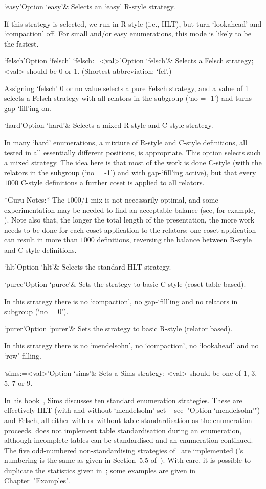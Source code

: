 \>`easy'{Option `easy'}&
Selects an \lq{}easy' R-style strategy.

If this strategy is selected, we run in R-style (i.e., HLT), but  turn
`lookahead' and `compaction' off. For small and/or easy  enumerations,
this mode is likely to be the fastest.

\>`felsch'{Option `felsch'}
\>`felsch:=<val>'{Option `felsch'}&
Selects a Felsch strategy; <val> should be 0 or 1. 
(Shortest abbreviation: `fel'.)

Assigning `felsch' 0 or no value selects a pure Felsch strategy, and a
value of 1 selects a Felsch strategy with all relators in the subgroup
(`no = -1') and turns gap-`fill'ing on.

\>`hard'{Option `hard'}&  
Selects a mixed R-style and C-style strategy.

In many \lq{}hard' enumerations, a  mixture  of  R-style  and  C-style
definitions, all tested in all  essentially  different  positions,  is
appropriate. This option selects such a mixed strategy. The idea  here
is that most of the work is done C-style (with  the  relators  in  the
subgroup (`no = -1') and with gap-`fill'ing active),  but  that  every
$1000$ C-style definitions a further coset is applied to all relators.

*Guru  Notes:*
The $1000/1$ mix is not necessarily optimal, and some  experimentation
may be needed  to  find  an  acceptable  balance  (see,  for  example,
\cite{HR99b}). Note also that, the longer  the  total  length  of  the
presentation,  the  more  work  needs  to  be  done  for  each   coset
application to the relators; one coset application can result in  more
than $1000$ definitions, reversing the  balance  between  R-style  and
C-style definitions.

\>`hlt'{Option `hlt'}&
Selects the standard HLT strategy.

\>`purec'{Option `purec'}&
Sets the strategy to basic C-style (coset table based).

In this strategy there is no `compaction',  no  gap-`fill'ing  and  no
relators in subgroup (`no = 0').

\>`purer'{Option `purer'}&
Sets the strategy  to basic R-style (relator based).

In this  strategy  there  is  no  `mendelsohn',  no  `compaction',  no
`lookahead' and no `row'-filling.

\>`sims:=<val>'{Option `sims'}&
Sets a Sims strategy; <val> should be one of 1, 3, 5, 7 or 9.

In his book~\cite{Sim94},  Sims  discusses  ten  standard  enumeration
strategies. These are effectively HLT (with and  without  `mendelsohn'
set -- see~"Option `mendelsohn'")  and  Felsch,  all  either  with  or
without table standardisation as the enumeration proceeds. {\ACE} does
not implement table standardisation during  an  enumeration,  although
incomplete tables can be standardised and  an  enumeration  continued.
The five odd-numbered non-standardising strategies of~\cite{Sim94} are
implemented ({\ACE}'s numbering is the same as  given  in  Section~5.5
of~\cite{Sim94}).  With  care,  it  is  possible  to   duplicate   the
statistics  given  in~\cite{Sim94};  some  examples   are   given   in
Chapter~"Examples". %

